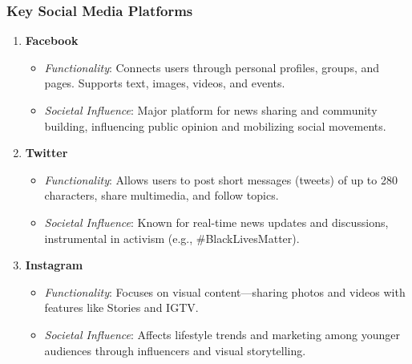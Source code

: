 \documentclass{beamer}
\begin{document}
\begin{frame}[fragile]
    \frametitle{Key Social Media Platforms}
    \begin{enumerate}
        \item \textbf{Facebook}
            \begin{itemize}
                \item \textit{Functionality}: Connects users through personal profiles, groups, and pages. Supports text, images, videos, and events.
                \item \textit{Societal Influence}: Major platform for news sharing and community building, influencing public opinion and mobilizing social movements.
            \end{itemize}
        
        \item \textbf{Twitter}
            \begin{itemize}
                \item \textit{Functionality}: Allows users to post short messages (tweets) of up to 280 characters, share multimedia, and follow topics.
                \item \textit{Societal Influence}: Known for real-time news updates and discussions, instrumental in activism (e.g., \#BlackLivesMatter).
            \end{itemize}
        
        \item \textbf{Instagram}
            \begin{itemize}
                \item \textit{Functionality}: Focuses on visual content—sharing photos and videos with features like Stories and IGTV.
                \item \textit{Societal Influence}: Affects lifestyle trends and marketing among younger audiences through influencers and visual storytelling.
            \end{itemize}
    \end{enumerate}
\end{frame}
\end{document}
